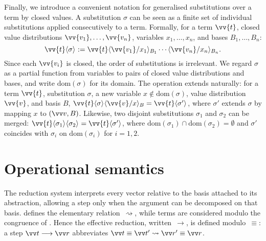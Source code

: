 \documentclass[runningheads,orivec,envcountsame,envcountsect]{llncs}
\newcommand\lra{\longrightarrow}
\newcommand\ansubst[2]{\ensuremath{\langle #1 \rangle_{#2}}}
\newcommand\dom[1]{\mathrm{dom}(#1)}
\def\lraneq{\rightsquigarrow}
\begin{document}
Finally, we introduce a convenient notation for generalised substitutions over
a term by closed values. A substitution $\sigma$ can be seen as a finite set of
individual substitutions applied consecutively to a term. Formally, for a term
$\vv{t}$, closed value distributions $\vv{v_1},\dots,\vv{v_n}$, variables
$x_1,\dots,x_n$, and bases $B_1,\dots,B_n$:
\[
  \vv{t}\ansubst{\sigma}{}
  := \vv{t}\ansubst{\vv{v_1}/x_1}{B_1}\dotsb\ansubst{\vv{v_n}/x_n}{B_n}.
\]
Since each $\vv{v_i}$ is closed, the order of substitutions is irrelevant. We
regard $\sigma$ as a partial function from variables to pairs of closed value
distributions and bases, and write $\dom{\sigma}$ for its domain. The operation
extends naturally: for a term $\vv{t}$, substitution $\sigma$, a new variable
$x\notin\dom{\sigma}$, value distribution $\vv{v}$, and basis $B$,
\(
  \vv{t}\ansubst{\sigma}{}\ansubst{\vv{v}/x}{B}
  = \vv{t}\ansubst{\sigma'}{}
\),
where $\sigma'$ extends $\sigma$ by mapping $x$ to $(\vv v,B)$. Likewise, two
disjoint substitutions $\sigma_1$ and $\sigma_2$ can be merged:
\(
  \vv{t}\ansubst{\sigma_1}{}\ansubst{\sigma_2}{}
  = \vv{t}\ansubst{\sigma'}{}
\),
where $\dom{\sigma_1}\cap\dom{\sigma_2}=\emptyset$ and $\sigma'$ coincides with
$\sigma_i$ on $\dom{\sigma_i}$ for $i=1,2$.


\section{Operational semantics}\label{sec:reduction}

The reduction system interprets every vector relative to the basis attached to
its abstraction, allowing a step only when the argument can be decomposed on
that basis.  
 defines the elementary relation~$\lraneq$, while terms are
considered modulo the congruence of .  
Hence the effective reduction, written~$\lra$, is defined modulo~$\equiv$:
a step $\vv t\lra\vv r$ abbreviates $\vv t\equiv\vv t'\lraneq\vv r'\equiv\vv r$.
\end{document}
